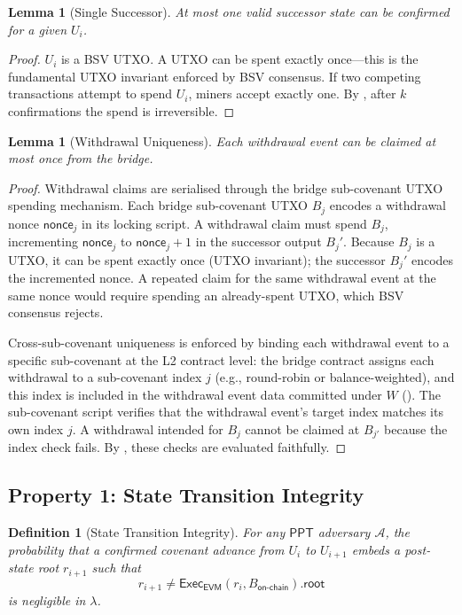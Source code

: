 \documentclass[11pt,a4paper]{article}
\newtheorem{definition}{Definition}[section]
\newtheorem{lemma}[theorem]{Lemma}
\newcommand{\PPT}{\mathsf{PPT}}
\newcommand{\Adv}{\mathcal{A}}
\newcommand{\Exec}{\mathsf{Exec}}
\newcommand{\EVM}{\mathsf{EVM}}
\begin{document}
\begin{lemma}[Single Successor]\label{lem:single}
At most one valid successor state can be confirmed for a given $U_i$.
\end{lemma}

\begin{proof}
$U_i$ is a BSV UTXO. A UTXO can be spent exactly once---this is the fundamental UTXO invariant enforced by BSV consensus. If two competing transactions attempt to spend $U_i$, miners accept exactly one. By , after $k$ confirmations the spend is irreversible. \qedhere
\end{proof}

\begin{lemma}[Withdrawal Uniqueness]\label{lem:withdrawal-unique}
Each withdrawal event can be claimed at most once from the bridge.
\end{lemma}

\begin{proof}
Withdrawal claims are serialised through the bridge sub-covenant UTXO spending mechanism. Each bridge sub-covenant UTXO $B_j$ encodes a withdrawal nonce $\mathsf{nonce}_j$ in its locking script. A withdrawal claim must spend $B_j$, incrementing $\mathsf{nonce}_j$ to $\mathsf{nonce}_j + 1$ in the successor output $B_j'$. Because $B_j$ is a UTXO, it can be spent exactly once (UTXO invariant); the successor $B_j'$ encodes the incremented nonce. A repeated claim for the same withdrawal event at the same nonce would require spending an already-spent UTXO, which BSV consensus rejects.

Cross-sub-covenant uniqueness is enforced by binding each withdrawal event to a specific sub-covenant at the L2 contract level: the bridge contract assigns each withdrawal to a sub-covenant index $j$ (e.g., round-robin or balance-weighted), and this index is included in the withdrawal event data committed under $W$ (). The sub-covenant script verifies that the withdrawal event's target index matches its own index $j$. A withdrawal intended for $B_j$ cannot be claimed at $B_{j'}$ because the index check fails. By , these checks are evaluated faithfully. \qedhere
\end{proof}


\subsection{Property 1: State Transition Integrity}

\begin{definition}[State Transition Integrity]\label{def:sti}
For any $\PPT$ adversary $\Adv$, the probability that a confirmed covenant advance from $U_i$ to $U_{i+1}$ embeds a post-state root $r_{i+1}$ such that
\[
    r_{i+1} \neq \Exec_{\EVM}(r_i, B_{\mathsf{on\text{-}chain}}).\mathsf{root}
\]
is negligible in $\lambda$.
\end{definition}
\end{document}
